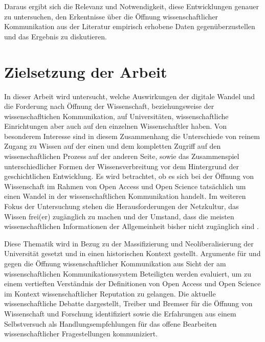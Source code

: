 Daraus ergibt sich die Relevanz und Notwendigkeit, diese Entwicklungen genauer zu untersuchen, den Erkentnisse über die Öffnung wissenschaftlicher Kommunikation aus der Literatur empirisch erhobene Daten gegenüberzustellen und das Ergebnis zu diskutieren.

\section{Zielsetzung der Arbeit}

In dieser Arbeit wird untersucht, welche Auswirkungen der digitale Wandel und die Forderung nach Öffnung der Wissenschaft, beziehungsweise der wissenschafltichen Kommunikation, auf Universitäten, wissenschaftliche Einrichtungen aber auch auf den einzelnen Wissenschaftler haben. Von besonderem Interesse sind in diesem Zusammenhang die Unterschiede von reinem Zugang zu Wissen auf der einen und dem kompletten Zugriff auf den wissenschaftlichen Prozess auf der anderen Seite, sowie das Zusammenspiel unterschiedlicher Formen der Wissensverbreitung vor dem Hintergrund der geschichtlichen Entwicklung. Es wird betrachtet, ob es sich bei der Öffnung von Wissenschaft im Rahmen von Open Access und Open Science tatsächlich um einen Wandel in der wissenschaftlichen Kommunikation handelt. Im weiteren Fokus der Untersuchung stehen die Herausforderungen der Netzkultur, das Wissen frei(er) zugänglich zu machen und der Umstand, dass die meisten wissenschaftlichen Informationen der Allgemeinheit bisher nicht zugänglich sind \cite{cite:6}.

Diese Thematik wird in Bezug zu der Massifizierung und Neoliberalisierung der Universität gesetzt und in einen historischen Kontext gestellt. Argumente für und gegen die Öffnung wissenschaftlicher Kommunikation aus Sicht der am wissenschaftlichen Kommunikationssystem Beteiligten werden evaluiert, um zu einem vertieften Verständnis der Definitionen von Open Access und Open Science im Kontext wissenschaftlicher Reputation zu gelangen. Die aktuelle wissenschaftliche Debatte dargestellt, Treiber und Bremser für die Öffnung von Wissenschaft und Forschung identifiziert sowie die Erfahrungen aus einem Selbstversuch als Handlungsempfehlungen für das offene Bearbeiten wissenschaftlicher Fragestellungen kommuniziert.

